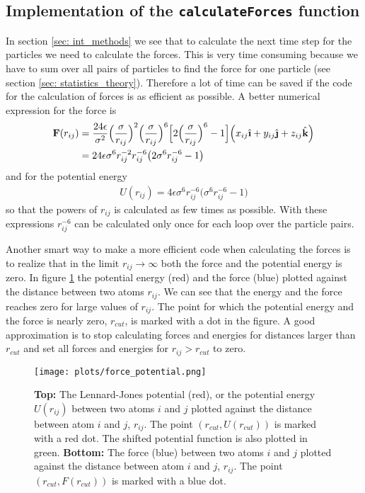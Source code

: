 \documentclass[11pt,a4wide]{article}
\renewcommand{\vec}{\mathbf}
\newcommand{\ihat}{\hat{\textbf{\i}}}
\newcommand{\jhat}{\hat{\textbf{\j}}}
\newcommand{\khat}{\hat{\textbf{k}}}
\begin{document}
\subsection{Implementation of the \texttt{calculateForces} function}
In section \ref{sec: int_methods} we see that to calculate the next time step for the particles we need to calculate the forces. This is very time consuming because we have to sum over all pairs of particles to find the force for one particle (see section \ref{sec: statistics_theory}). Therefore a lot of time can be saved if the code for the calculation of forces is as efficient as possible. A better numerical expression for the force is
\begin{align*}
\vec F(r_{ij}) &= \frac{24\epsilon}{\sigma^2} \Big(\frac{\sigma}{r_{ij}}\Big)^2\Big(\frac{\sigma}{r_{ij}}\Big)^6\Big[2\Big(\frac{\sigma}{r_{ij}}\Big)^{6} - 1 \Big]\Big(x_{ij}\ihat + y_{ij}\jhat + z_{ij}\khat \Big)\\
&= 24\epsilon\sigma^6r_{ij}^{-2}r_{ij}^{-6}\big(2\sigma^6r_{ij}^{-6} - 1\big)
\end{align*}
and for the potential energy
\begin{align*}
U(r_{ij}) = 4\epsilon\sigma^6r_{ij}^{-6}\big(\sigma^6r_{ij}^{-6} - 1\big)
\end{align*}
so that the powers of $r_{ij}$ is calculated as few times as possible. With these expressions $r_{ij}^{-6}$ can be calculated only once for each loop over the particle pairs.  

Another smart way to make a more efficient code when calculating the forces is to realize that in the limit $r_{ij}\rightarrow \infty$ both the force and the potential energy is zero. In figure \ref{fig: force_potential} the potential energy (red) and the force (blue) plotted against the distance between two atoms $r_{ij}$. We can see that the energy and the force reaches zero for large values of $r_{ij}$.  The point for which the potential energy and the force is nearly zero, $r_{cut}$, is marked with a dot in the figure. A good approximation is to stop calculating forces and energies for distances larger than $r_{cut}$ and set all forces and energies for $r_{ij} > r_{cut}$ to zero.

\begin{figure}
\centering
\texttt{[image: plots/force\_potential.png]}
\caption{\textbf{Top:} The Lennard-Jones potential (red), or the potential energy $U(r_{ij})$ between two atoms $i$ and $j$ plotted against the distance between atom $i$ and $j$, $r_{ij}$. The point $(r_{cut},U(r_{cut}))$ is marked with a  red dot. The shifted potential function is also plotted in green. \textbf{Bottom:}  The force (blue) between two atoms $i$ and $j$ plotted against the distance between atom $i$ and $j$, $r_{ij}$. The point $(r_{cut}, F(r_{cut}))$ is marked with a blue dot.}
\label{fig: force_potential}
\end{figure}
\end{document}
